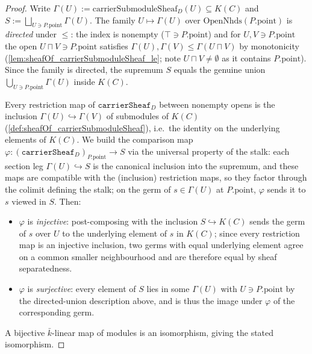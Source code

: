 \begin{proof}
        \leanok
  Write \(\Gamma(U) := \mathrm{carrierSubmoduleSheaf}_D(U) \subseteq K(C)\) and
  \(S := \bigsqcup_{U \ni P.\mathrm{point}} \Gamma(U)\). The family
  \(U \mapsto \Gamma(U)\) over \(\mathrm{OpenNhds}(P.\mathrm{point})\) is
  \emph{directed} under \(\le\): the index is nonempty (\(\top \ni
  P.\mathrm{point}\)) and for \(U, V \ni P.\mathrm{point}\) the open \(U \sqcap V
  \ni P.\mathrm{point}\) satisfies \(\Gamma(U), \Gamma(V) \le \Gamma(U \sqcap
  V)\) by monotonicity (\cref{lem:sheafOf_carrierSubmoduleSheaf_le}; note
  \(U \sqcap V \ne \emptyset\) as it contains \(P.\mathrm{point}\)). Since the
  family is directed, the supremum \(S\) equals the genuine union
  \(\bigcup_{U \ni P.\mathrm{point}} \Gamma(U)\) inside \(K(C)\).

  Every restriction map of \(\texttt{carrierSheaf}_D\) between nonempty opens is
  the inclusion \(\Gamma(U) \hookrightarrow \Gamma(V)\) of submodules of \(K(C)\)
  (\cref{def:sheafOf_carrierSubmoduleSheaf}), i.e.\ the identity on the
  underlying elements of \(K(C)\). We build the comparison map
  \(\varphi : (\texttt{carrierSheaf}_D)_{P.\mathrm{point}} \to S\) via the
  universal property of the stalk: each section leg \(\Gamma(U) \hookrightarrow
  S\) is the canonical inclusion into the supremum, and these maps are compatible
  with the (inclusion) restriction maps, so they factor through the colimit
  defining the stalk; on the germ of \(s \in \Gamma(U)\) at \(P.\mathrm{point}\),
  \(\varphi\) sends it to \(s\) viewed in \(S\). Then:
  \begin{itemize}
  \item \(\varphi\) is \emph{injective}: post-composing with the inclusion
    \(S \hookrightarrow K(C)\) sends the germ of \(s\) over \(U\) to the
    underlying element of \(s\) in \(K(C)\); since every restriction map is an
    injective inclusion, two germs with equal underlying element agree on a
    common smaller neighbourhood and are therefore equal by sheaf separatedness.
  \item \(\varphi\) is \emph{surjective}: every element of \(S\) lies in some
    \(\Gamma(U)\) with \(U \ni P.\mathrm{point}\) by the directed-union
    description above, and is thus the image under \(\varphi\) of the
    corresponding germ.
  \end{itemize}
  A bijective \(\bar k\)-linear map of modules is an isomorphism, giving the
  stated isomorphism.
\end{proof}

